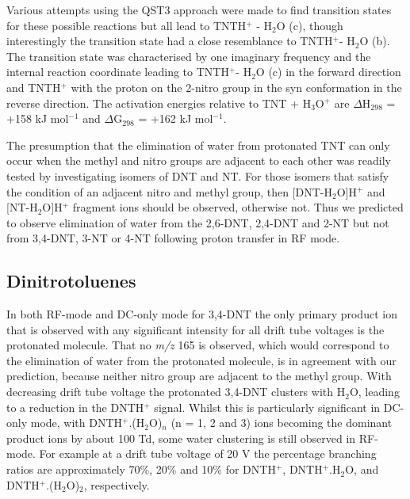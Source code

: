 Various attempts using the QST3 approach were made to find transition states for these possible reactions but all lead to TNTH$^+$ - H$_2$O (c), though interestingly the transition state had a close resemblance to TNTH$^+$- H$_2$O (b). The transition state was characterised by one imaginary frequency and the internal reaction coordinate leading to TNTH$^+$- H$_2$O (c) in the forward direction and TNTH$^+$ with the proton on the 2-nitro group in the syn conformation in the reverse direction. The activation energies relative to TNT + H$_3$O$^+$ are $\Delta$H$_{298}$ = +158 kJ mol$^{-1}$ and $\Delta$G$_{298}$ = +162 kJ mol$^{-1}$. 

The presumption that the elimination of water from protonated TNT can only occur when the methyl and nitro groups are adjacent to each other was readily tested by investigating isomers of DNT and NT. For those isomers that satisfy the condition of an adjacent nitro and methyl group, then [DNT-H$_2$O]H$^+$ and [NT-H$_2$O]H$^+$ fragment ions should be observed, otherwise not. Thus we predicted to observe elimination of water from the 2,6-DNT, 2,4-DNT and 2-NT but not from 3,4-DNT, 3-NT or 4-NT following proton transfer in RF mode.







\subsection{Dinitrotoluenes}
In both RF-mode and DC-only mode for 3,4-DNT the only primary product ion that is observed with any significant intensity for all drift tube voltages is the protonated molecule. That no \textit{m/z} 165 is observed, which would correspond to the elimination of water from the protonated molecule, is in agreement with our prediction, because neither nitro group are adjacent to the methyl group. With decreasing drift tube voltage the protonated 3,4-DNT clusters with H$_2$O, leading to a reduction in the DNTH$^+$ signal. Whilst this is particularly
significant in DC-only mode, with DNTH$^+$.(H$_2$O)$_n$ (n = 1, 2 and 3) ions becoming the dominant product ions by about 100 Td, some water clustering is still observed in RF-mode. For example at a drift tube voltage of 20 V the percentage branching ratios are approximately 70\%, 20\% and 10\% for DNTH$^+$, DNTH$^+$.H$_2$O, and DNTH$^+$.(H$_2$O)$_2$, respectively. 

